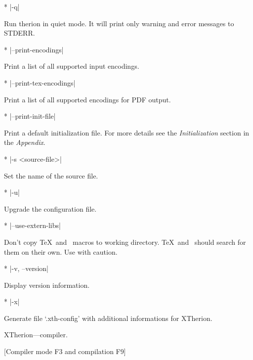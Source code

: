 * |-q|

        Run therion in quiet mode. It will print only warning
        and error messages to STDERR.

* |--print-encodings|

        Print a list of all supported input encodings.
        
* |--print-tex-encodings|

        Print a list of all supported encodings for PDF output.
        
* |--print-init-file|

        Print a default initialization file. For more details
        see the {\it Initialization} section in the {\it Appendix}.
        
* |-s <source-file>|

        Set the name of the source file.
        
* |-u|

        Upgrade the configuration file.

* |--use-extern-libs|
  
  Don't copy \TeX\ and \MP\ macros to working directory. \TeX\ and \MP\ 
  should search for them on their own. Use with caution.

* |-v, --version|

  Display version information.        
        
* |-x|

  Generate file `.xth-config' with additional informations for XTherion.
\endoptions

\subsubchapter XTherion---compiler.

[Compiler mode F3 and compilation F9]


\endinput
